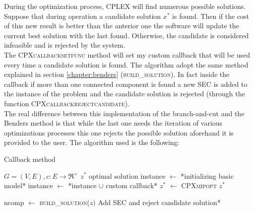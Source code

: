 During the optimization process, CPLEX will find numerous possible solutions. Suppose that during operation a candidate solution $x^*$ is found. Then if the cost of this new result is better than the anterior one the software will update the current best solution with the last found. Otherwise, the candidate is considered infeasible and is rejected by the system.\\
The \textsc{CPXcallbacksetfunc} method will set my custom callback that will be used every time a candidate solution is found. The algorithm adopt the same method explained in section \ref{chapter:benders} (\textsc{build\_solution}). In fact inside the callback if more than one connected component is found a new SEC is added to the instance of the problem and the candidate solution is rejected (through the function \textsc{CPXcallbackrejectcandidate}).\\
The real difference between this implementation of the branch-and-cut and the Benders method is that while the last one needs the iteration of various optimizations processes this one rejects the possible solution aforehand it is provided to the user.
The algorithm used is the following:
\begin{algorithm}
	\caption{Callback method}\label{algo:callback}
	\begin{algorithmic}[1]
		\Require $G=(V,E), c:E\rightarrow \Re^+$
		\Ensure $z^*\text{ optimal solution}$
		\State instance $\gets$ *initializing basic model*
		\State instance $\gets$ *instance $\cup$ custom callback*
		\State $z^*$ $\gets$ \textsc{CPXmipopt}
		\State \Return $z^*$
		\EndProcedure
		
			\State ncomp $\gets$ \textsc{build\_solution}($z)$
				\State *Add SEC and reject candidate solution*
			\EndIf
			\State \Return
		\EndProcedure
		
	\end{algorithmic}
\end{algorithm}